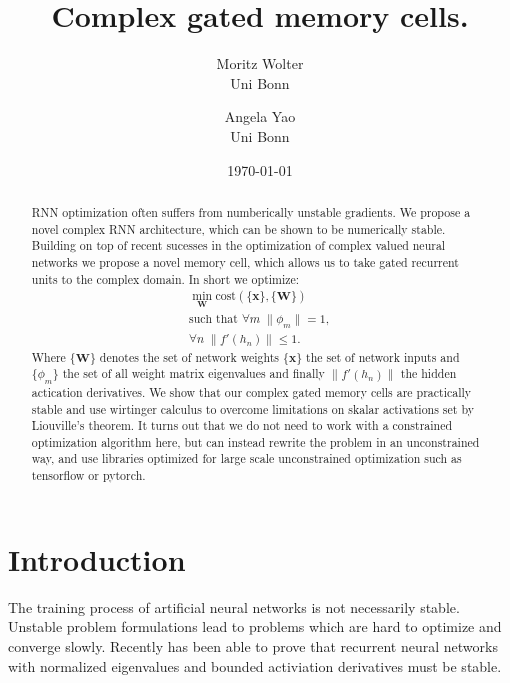 \documentclass{article}
\title{Complex gated memory cells.}
\author{Moritz Wolter  \\
    Uni Bonn  \\
    \and 
    Angela Yao \\
    Uni Bonn \\
    }
\date{\today}
\begin{document}
\tableofcontents
\newpage
\maketitle
\begin{abstract}
RNN optimization often suffers from numberically unstable gradients. We propose a novel complex RNN architecture, which can be shown to be numerically stable. Building on top of recent sucesses in the optimization of complex valued neural networks we propose a novel memory cell, which allows us to take gated recurrent units to the complex domain. In short we optimize: 
\begin{align}
\min_{\mathbf{W}} \text{cost}(\{\mathbf{x}\}, \{\mathbf{W}\}) \\
\text{such that } \forall m \; \| \phi_m \| = 1, \\
                  \forall n \; \| f'(h_n) \| \leq 1.
\end{align}
Where $\{\mathbf{W}\}$ denotes the set of network weights $\{\mathbf{x}\}$ the set of network inputs and $\{\phi_m\}$ the set of all weight matrix eigenvalues and finally $\|f'(h_n) \|$ the hidden actication derivatives.
We show that our complex gated memory cells are practically stable and use wirtinger calculus to overcome limitations on skalar activations set by Liouville's theorem. It turns out that we do not need to work with a constrained optimization algorithm here, but can instead rewrite the problem in an unconstrained way, and use libraries optimized for large scale unconstrained optimization such as tensorflow or pytorch.
\end{abstract}

\section{Introduction}
The training process of artificial neural networks is not necessarily stable. Unstable problem formulations lead to problems which are hard to optimize and converge slowly. Recently \cite{Arjovsky} has been able to prove that recurrent neural networks with normalized eigenvalues and bounded activiation derivatives must be stable. 
\end{document}
